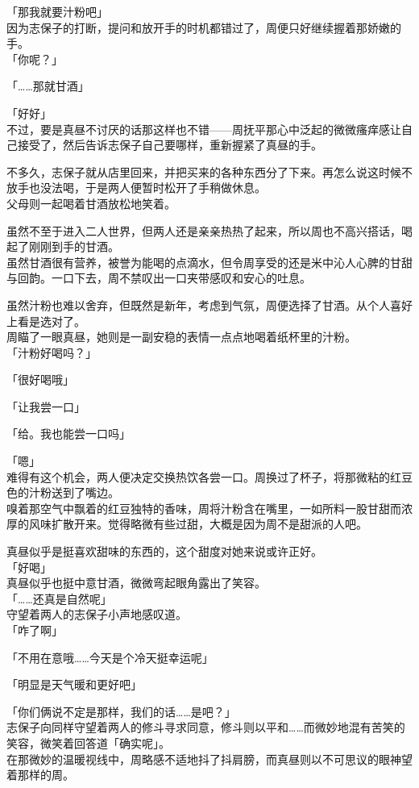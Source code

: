 「那我就要汁粉吧」\\

因为志保子的打断，提问和放开手的时机都错过了，周便只好继续握着那娇嫩的手。\\

「你呢？」

「……那就甘酒」

「好好」\\

不过，要是真昼不讨厌的话那这样也不错——周抚平那心中泛起的微微瘙痒感让自己接受了，然后告诉志保子自己要哪样，重新握紧了真昼的手。\\

\vspace{2\baselineskip}

不多久，志保子就从店里回来，并把买来的各种东西分了下来。再怎么说这时候不放手也没法喝，于是两人便暂时松开了手稍做休息。\\

父母则一起喝着甘酒放松地笑着。

虽然不至于进入二人世界，但两人还是亲亲热热了起来，所以周也不高兴搭话，喝起了刚刚到手的甘酒。\\

虽然甘酒很有营养，被誉为能喝的点滴水，但令周享受的还是米中沁人心脾的甘甜与回韵。一口下去，周不禁叹出一口夹带感叹和安心的吐息。

虽然汁粉也难以舍弃，但既然是新年，考虑到气氛，周便选择了甘酒。从个人喜好上看是选对了。\\

周瞄了一眼真昼，她则是一副安稳的表情一点点地喝着纸杯里的汁粉。\\

「汁粉好喝吗？」

「很好喝哦」

「让我尝一口」

「给。我也能尝一口吗」

「嗯」\\

难得有这个机会，两人便决定交换热饮各尝一口。周换过了杯子，将那微粘的红豆色的汁粉送到了嘴边。\\

嗅着那空气中飘着的红豆独特的香味，周将汁粉含在嘴里，一如所料一股甘甜而浓厚的风味扩散开来。觉得略微有些过甜，大概是因为周不是甜派的人吧。

真昼似乎是挺喜欢甜味的东西的，这个甜度对她来说或许正好。\\

「好喝」\\

真昼似乎也挺中意甘酒，微微弯起眼角露出了笑容。\\

「……还真是自然呢」\\

守望着两人的志保子小声地感叹道。\\

「咋了啊」

「不用在意哦……今天是个冷天挺幸运呢」

「明显是天气暖和更好吧」

「你们俩说不定是那样，我们的话……是吧？」\\

志保子向同样守望着两人的修斗寻求同意，修斗则以平和……而微妙地混有苦笑的笑容，微笑着回答道「确实呢」。\\

在那微妙的温暖视线中，周略感不适地抖了抖肩膀，而真昼则以不可思议的眼神望着那样的周。
